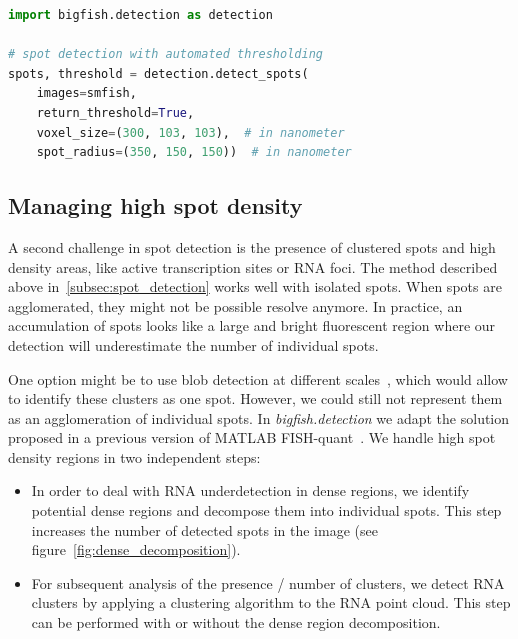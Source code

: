 \begin{minipage}{0.9\textwidth}
\begin{lstlisting}[language=Python]
import bigfish.detection as detection

# spot detection with automated thresholding
spots, threshold = detection.detect_spots(
    images=smfish,
    return_threshold=True,
    voxel_size=(300, 103, 103),  # in nanometer
    spot_radius=(350, 150, 150))  # in nanometer
\end{lstlisting}
\end{minipage}

\subsection{Managing high spot density}
\label{subsec:dense_decomposition}


A second challenge in spot detection is the presence of clustered spots and high density areas, like active transcription sites or \ac{RNA} foci.
The method described above in~\ref{subsec:spot_detection} works well with isolated spots.
When spots are agglomerated, they might not be possible resolve anymore.
In practice, an accumulation of spots looks like a large and bright fluorescent region where our detection will underestimate the number of individual spots.

One option might be to use blob detection at different scales~\cite{walt_scikit-image_2014}, which would allow to identify these clusters as one spot. However, we could still not represent them as an agglomeration of individual spots. 
In \emph{bigfish.detection} we adapt the solution proposed in a previous version of MATLAB FISH-quant~\cite{mueller_fish-quant_2013, samacoits_computational_2018}.
We handle high spot density regions in two independent steps:

\begin{itemize}
	\setlength\itemsep{0.1em}
	\item In order to deal with \ac{RNA} underdetection in dense regions, we identify potential dense regions and decompose them into individual spots. This step increases the number of detected spots in the image (see figure~\ref{fig:dense_decomposition}).
	\item For subsequent analysis of the presence / number of clusters, we detect \ac{RNA} clusters by applying a clustering algorithm to the \ac{RNA} point cloud. This step can be performed with or without the dense region decomposition. 
\end{itemize}

